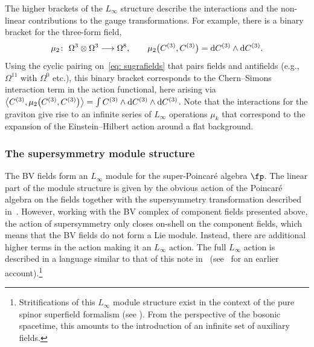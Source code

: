 \documentclass[10pt,a4paper]{amsart}
\numberwithin{equation}{section}
\theoremstyle{definition}
\def\d{{\rm d}}
\begin{document}
The higher brackets of the $L_\infty$ structure describe the interactions and the non-linear contributions to the gauge transformations. For example, there is a binary bracket for the three-form field,
\begin{equation}
 \mu_2\colon\ \Omega^3 \otimes \Omega^3 \longrightarrow \Omega^8, \qquad \mu_2\big( C^{(3)}, C^{(3)}\big) = \d C^{(3)} \wedge \d C^{(3)}.
\end{equation}
Using the cyclic pairing on~\eqref{eq: sugrafields} that pairs fields and antifields (e.g., $\Omega^{11}$ with $\Omega^0$ etc.), this binary bracket corresponds to the Chern--Simons interaction term in the action functional, here arising via $\big\langle C^{(3)} , \mu_2\big(C^{(3)}, C^{(3)}\big) \big\rangle = \int C^{(3)} \wedge \d C^{(3)} \wedge \d C^{(3)} $. Note that the interactions for the graviton give rise to an infinite series of $L_\infty$ operations $\mu_k$ that correspond to the expansion of the Einstein--Hilbert action around a flat background.

\subsubsection{The supersymmetry module structure}
The BV fields form an $L_\infty$ module for the super-Poincar\'e algebra $\fp$. The linear part of the module structure is given by the obvious action of the Poincar\'e algebra on the fields together with the supersymmetry transformation described in~\cite{CJS}. However, working with the BV complex of component fields presented above, the action of supersymmetry only closes on-shell on the component fields, which means that the BV fields do not form a Lie module. Instead, there are additional higher terms in the action making it an $L_\infty$ action. The full $L_\infty$ action is described in a language similar to that of this note in~\cite{MaxTwist} (see~\cite{BerkovitsSupermembrane} for an earlier account).\footnote{Stritifications of this $L_\infty$ module structure exist in the context of the pure spinor superfield formalism (see \cite{Ced-11d, CY2}). From the perspective of the bosonic spacetime, this amounts to the introduction of an infinite set of auxiliary fields.}
\end{document}
